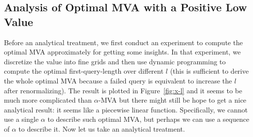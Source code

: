 %

\subsection{Analysis of Optimal MVA with a Positive Low Value}\label{sec:general_analysis}

Before an analytical treatment, we first conduct an experiment to compute the
optimal MVA approximately for getting some insights. In that experiment, we
discretize the value into fine grids and then use dynamic programming to
compute the optimal first-query-length over different $l$ (this is sufficient to derive the whole
optimal MVA because a failed query is equivalent to increase the $l$ after
renormalizing). The result is plotted in Figure~\ref{fig:x-l}
and it seems to be much more complicated than $\alpha$-MVA but there might
still be hope to get a nice analytical result: it seems like a piecewise linear
function. Specifically, we cannot use a single $\alpha$ to describe such
optimal MVA, but perhaps we can use a sequence of $\alpha$ to describe it. Now
let us take an analytical treatment.


